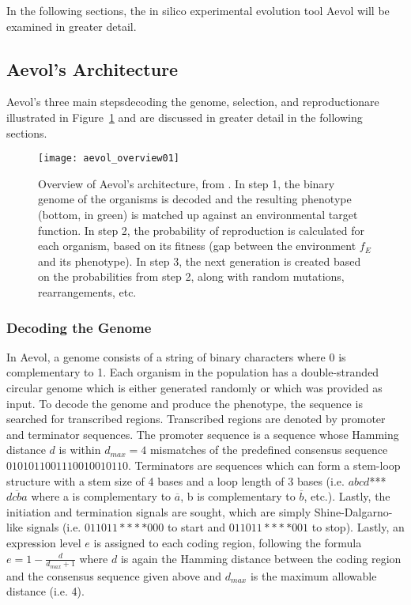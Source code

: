 In the following sections, the in silico experimental evolution tool Aevol will be examined in greater detail. 

\subsection{Aevol's Architecture}
Aevol's three main steps\textemdash decoding the genome, selection, and reproduction\textemdash are illustrated in Figure~\ref{fig:aevol_overview01} and are discussed in greater detail in the following sections. 

\begin{figure}[H]
	\texttt{[image: aevol\_overview01]}
	\centering
	\caption[Overview of Aevol's architecture.]{Overview of Aevol's architecture, from \cite{Batut.2013}. In step 1, the binary genome of the organisms is decoded and the resulting phenotype (bottom, in green) is matched up against an environmental target function. In step 2, the probability of reproduction is calculated for each organism, based on its fitness (gap between the environment $f_E$ and its phenotype). In step 3, the next generation is created based on the probabilities from step 2, along with random mutations, rearrangements, etc.}
	\label{fig:aevol_overview01}
\end{figure}
\subsubsection{Decoding the Genome}\label{subsec:aevol_decoding}
In Aevol, a genome consists of a string of binary characters where 0 is complementary to 1. Each organism in the population has a double-stranded circular genome which is either generated randomly or which was provided as input. To decode the genome and produce the phenotype, the sequence is searched for transcribed regions. Transcribed regions are denoted by promoter and terminator sequences. The promoter sequence is a sequence whose Hamming distance $d$ is within $d_{max} = 4$ mismatches of the predefined consensus sequence $0101011001110010010110$. Terminators are sequences which can form a stem-loop structure with a stem size of 4 bases and a loop length of 3 bases (i.e. $abcd$***$\overline{dcba}$ where a is complementary to $\overline{a}$, b is complementary to $\overline{b}$, etc.). Lastly, the initiation and termination signals are sought, which are simply Shine-Dalgarno-like signals (i.e. $011011****000$ to start and $011011****001$ to stop). Lastly, an expression level $e$ is assigned to each coding region, following the formula $e = 1 - \frac{d}{d_{max} + 1}$ where $d$ is again the Hamming distance between the coding region and the consensus sequence given above and $d_{max}$ is the maximum allowable distance (i.e. 4). 

